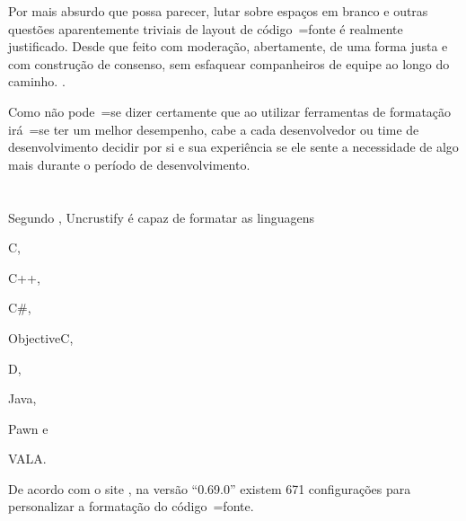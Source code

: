 %
\begin{citacao}
    Por mais absurdo que possa parecer,
    lutar sobre espaços em branco e
    outras questões aparentemente triviais de layout de código~=fonte é realmente justificado.
    Desde que feito com moderação,
    abertamente,
    de uma forma justa e
    com construção de consenso,
    sem esfaquear companheiros de equipe ao longo do caminho.
    \cite[tradução nossa\protect\footnotemark]{deathToTheSpaceInfidels}.
\end{citacao}

Como não pode~=se dizer certamente que ao utilizar ferramentas de formatação irá~=se ter um melhor desempenho,
cabe a cada desenvolvedor ou
time de desenvolvimento decidir por si e
sua experiência se ele sente a necessidade de algo mais durante o período de desenvolvimento.


\section{}
\label{trabalhosRelacionados}

Segundo ,
Uncrustify é capaz de formatar as linguagens \begin{inparaenum}[1)] \item C,
\item C++,
\item C\#,
\item ObjectiveC,
\item D,
\item Java,
\item Pawn e
\item VALA.
\end{inparaenum}%
De acordo com o site ,
na versão ``0.69.0'' existem 671 configurações para personalizar a formatação do código~=fonte.

